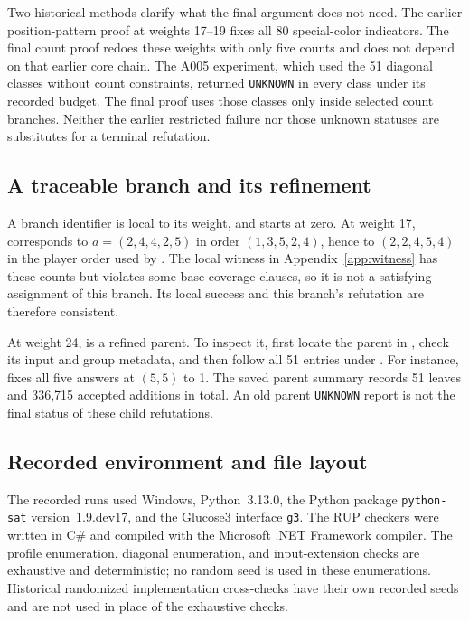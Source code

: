 Two historical methods clarify what the final argument does not need.
The earlier position-pattern proof at weights 17--19 fixes all 80
special-color indicators. The final count proof redoes these weights
with only five counts and does not depend on that earlier core chain.
The A005 experiment, which used the 51 diagonal classes without count
constraints, returned \texttt{UNKNOWN} in every class under its recorded
budget. The final proof uses those classes only inside selected count
branches. Neither the earlier restricted failure nor those unknown
statuses are substitutes for a terminal refutation.

\subsection{A traceable branch and its refinement}
A branch identifier is local to its weight, and starts at zero.
At weight 17,  corresponds to
$a=(2,4,4,2,5)$ in order $(1,3,5,2,4)$, hence to
$(2,2,4,5,4)$ in the player order used by .
The local witness in Appendix~\ref{app:witness} has these counts but
violates some base coverage clauses, so it is not a satisfying assignment
of this branch. Its local success and this branch's refutation are
therefore consistent.

At weight 24,  is a refined parent. To inspect it,
first locate the parent in , check
its input and group metadata, and then follow all 51 entries under
. For instance,  fixes all five
answers at $(5,5)$ to 1. The saved parent summary records 51 leaves and
336,715 accepted additions in total. An old parent \texttt{UNKNOWN}
report is not the final status of these child refutations.

\subsection{Recorded environment and file layout}
The recorded runs used Windows, Python~3.13.0, the Python package
\texttt{python-sat} version~1.9.dev17, and the Glucose3 interface
\texttt{g3}. The RUP checkers were written in C\# and compiled with the
Microsoft .NET Framework compiler. The profile enumeration, diagonal
enumeration, and input-extension checks are exhaustive and deterministic;
no random seed is used in these enumerations. Historical randomized
implementation cross-checks have their own recorded seeds and are not
used in place of the exhaustive checks.

